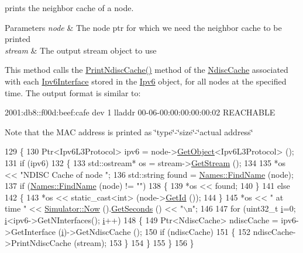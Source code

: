 prints the neighbor cache of a node. 


\begin{DoxyParams}{Parameters}
{\em node} & The node ptr for which we need the neighbor cache to be printed \\
\hline
{\em stream} & The output stream object to use\\
\hline
\end{DoxyParams}
This method calls the \hyperlink{classns3_1_1Ipv6RoutingHelper_a582eac0a7c42f77cdc5b8319f1c25897}{Print\+Ndisc\+Cache()} method of the \hyperlink{classns3_1_1NdiscCache}{Ndisc\+Cache} associated with each \hyperlink{classns3_1_1Ipv6Interface}{Ipv6\+Interface} stored in the \hyperlink{classns3_1_1Ipv6}{Ipv6} object, for all nodes at the specified time. The output format is similar to\+: \begin{DoxyVerb}2001:db8::f00d:beef:cafe dev 1 lladdr 00-06-00:00:00:00:00:02 REACHABLE
\end{DoxyVerb}
 Note that the M\+AC address is printed as \char`\"{}type\char`\"{}-\/\char`\"{}size\char`\"{}-\/\char`\"{}actual address\char`\"{} 
\begin{DoxyCode}
129 \{
130   Ptr<Ipv6L3Protocol> ipv6 = node->\hyperlink{classns3_1_1Object_a13e18c00017096c8381eb651d5bd0783}{GetObject}<Ipv6L3Protocol> ();
131   \textcolor{keywordflow}{if} (ipv6)
132     \{
133       std::ostream* os = stream->\hyperlink{classns3_1_1OutputStreamWrapper_a0cf30a4188ab6fdae2b2ab74db11acc2}{GetStream} ();
134 
135       *os << \textcolor{stringliteral}{"NDISC Cache of node "};
136       std::string found = \hyperlink{classns3_1_1Names_ab9664faf23569aaae64a2d1f65265045}{Names::FindName} (node);
137       \textcolor{keywordflow}{if} (\hyperlink{classns3_1_1Names_ab9664faf23569aaae64a2d1f65265045}{Names::FindName} (node) != \textcolor{stringliteral}{""})
138         \{
139           *os << found;
140         \}
141       \textcolor{keywordflow}{else}
142         \{
143           *os << static\_cast<int> (node->\hyperlink{classns3_1_1Node_aaf49b64a843565ce3812326313b370ac}{GetId} ());
144         \}
145       *os << \textcolor{stringliteral}{" at time "} << \hyperlink{classns3_1_1Simulator_ac3178fa975b419f7875e7105be122800}{Simulator::Now} ().\hyperlink{classns3_1_1Time_a8f20d5c3b0902d7b4320982f340b57c8}{GetSeconds} () << \textcolor{stringliteral}{"\(\backslash\)n"};
146 
147       \textcolor{keywordflow}{for} (uint32\_t \hyperlink{bernuolliDistribution_8m_a6f6ccfcf58b31cb6412107d9d5281426}{i}=0; \hyperlink{bernuolliDistribution_8m_a6f6ccfcf58b31cb6412107d9d5281426}{i}<ipv6->GetNInterfaces(); \hyperlink{bernuolliDistribution_8m_a6f6ccfcf58b31cb6412107d9d5281426}{i}++)
148         \{
149           Ptr<NdiscCache> ndiscCache = ipv6->GetInterface (\hyperlink{bernuolliDistribution_8m_a6f6ccfcf58b31cb6412107d9d5281426}{i})->GetNdiscCache ();
150           \textcolor{keywordflow}{if} (ndiscCache)
151             \{
152               ndiscCache->PrintNdiscCache (stream);
153             \}
154         \}
155     \}
156 \}
\end{DoxyCode}


